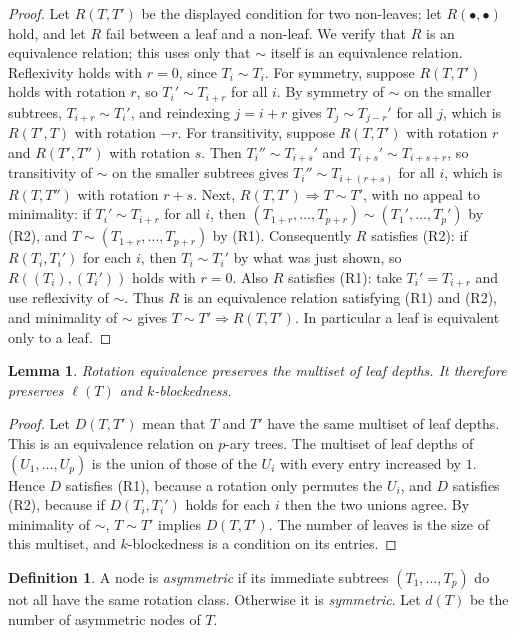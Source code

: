 \documentclass[11pt]{amsart}
\newtheorem{lemma}[theorem]{Lemma}
\theoremstyle{definition}
\newtheorem{definition}[theorem]{Definition}
\theoremstyle{remark}
\begin{document}
\begin{proof}
Let $R(T,T')$ be the displayed condition for two non-leaves; let $R(\bullet,\bullet)$ hold, and let $R$ fail between a leaf and a non-leaf.  We verify that $R$ is an equivalence relation; this uses only that $\sim$ itself is an equivalence relation.
Reflexivity holds with $r=0$, since $T_i\sim T_i$.
For symmetry, suppose $R(T,T')$ holds with rotation $r$, so $T_i'\sim T_{i+r}$ for all $i$.  By symmetry of $\sim$ on the smaller subtrees, $T_{i+r}\sim T_i'$, and reindexing $j=i+r$ gives $T_j\sim T_{j-r}'$ for all $j$, which is $R(T',T)$ with rotation $-r$.
For transitivity, suppose $R(T,T')$ with rotation $r$ and $R(T',T'')$ with rotation $s$.  Then $T_i''\sim T_{i+s}'$ and $T_{i+s}'\sim T_{i+s+r}$, so transitivity of $\sim$ on the smaller subtrees gives $T_i''\sim T_{i+(r+s)}$ for all $i$, which is $R(T,T'')$ with rotation $r+s$.
Next, $R(T,T')\Rightarrow T\sim T'$, with no appeal to minimality: if $T_i'\sim T_{i+r}$ for all $i$, then $(T_{1+r},\ldots,T_{p+r})\sim(T_1',\ldots,T_p')$ by (R2), and $T\sim(T_{1+r},\ldots,T_{p+r})$ by (R1).  Consequently $R$ satisfies (R2): if $R(T_i,T_i')$ for each $i$, then $T_i\sim T_i'$ by what was just shown, so $R((T_i),(T_i'))$ holds with $r=0$.  Also $R$ satisfies (R1): take $T_i'=T_{i+r}$ and use reflexivity of $\sim$.  Thus $R$ is an equivalence relation satisfying (R1) and (R2), and minimality of $\sim$ gives $T\sim T'\Rightarrow R(T,T')$.  In particular a leaf is equivalent only to a leaf.
\end{proof}
\begin{lemma}\label{lem:depth-invariant}
Rotation equivalence preserves the multiset of leaf depths.  It therefore preserves $\ell(T)$ and $k$-blockedness.
\end{lemma}
\begin{proof}
Let $D(T,T')$ mean that $T$ and $T'$ have the same multiset of leaf depths.  This is an equivalence relation on $p$-ary trees.  The multiset of leaf depths of $(U_1,\ldots,U_p)$ is the union of those of the $U_i$ with every entry increased by $1$.  Hence $D$ satisfies (R1), because a rotation only permutes the $U_i$, and $D$ satisfies (R2), because if $D(T_i,T_i')$ holds for each $i$ then the two unions agree.  By minimality of $\sim$, $T\sim T'$ implies $D(T,T')$.  The number of leaves is the size of this multiset, and $k$-blockedness is a condition on its entries.
\end{proof}
\begin{definition}
A node is \emph{asymmetric} if its immediate subtrees $(T_1,\ldots,T_p)$ do not all have the same rotation class.  Otherwise it is \emph{symmetric}.  Let $d(T)$ be the number of asymmetric nodes of $T$.
\end{definition}
\end{document}
